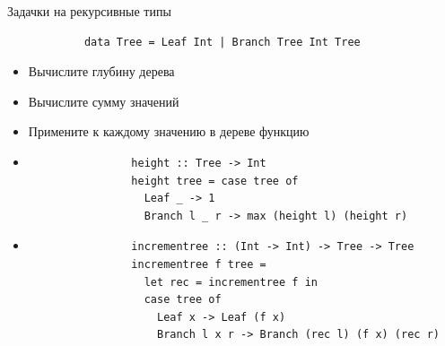     \begin{frame}[fragile]{Задачки на рекурсивные типы}
        \begin{verbatim}
            data Tree = Leaf Int | Branch Tree Int Tree
        \end{verbatim}
        \begin{itemize}
            \item[\todo] Вычислите глубину дерева
            \item[\todo] Вычислите сумму значений
            \item[\todo] Примените к каждому значению в дереве функцию
            \item[\answer] \pause
            \begin{verbatim}
                height :: Tree -> Int
                height tree = case tree of
                  Leaf _ -> 1
                  Branch l _ r -> max (height l) (height r)
            \end{verbatim}
            \item[\answer] \pause
            \begin{verbatim}
                incrementree :: (Int -> Int) -> Tree -> Tree
                incrementree f tree =
                  let rec = incrementree f in
                  case tree of
                    Leaf x -> Leaf (f x)
                    Branch l x r -> Branch (rec l) (f x) (rec r)
            \end{verbatim}
        \end{itemize}
    \end{frame}


